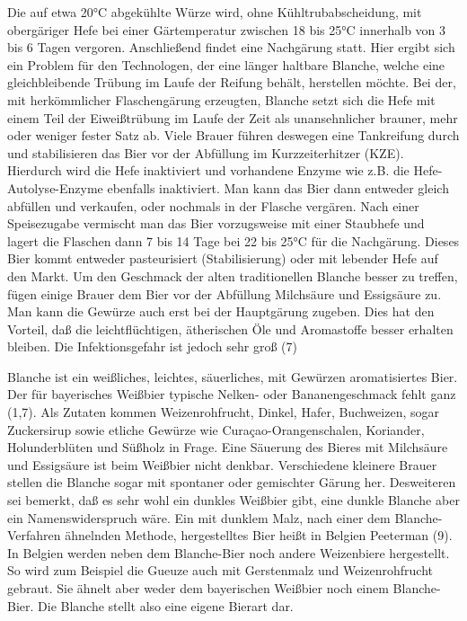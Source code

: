 \documentclass[a4paper,parskip=half]{scrartcl}
\begin{document}
Die auf etwa 20°C abgekühlte Würze wird, ohne Kühltrubabscheidung, mit
obergäriger Hefe bei einer Gärtemperatur zwischen 18 bis 25°C innerhalb von
3 bis 6 Tagen vergoren. Anschließend findet eine Nachgärung statt. Hier ergibt sich
ein Problem für den Technologen, der eine länger haltbare Blanche, welche eine
gleichbleibende Trübung im Laufe der Reifung behält, herstellen möchte. Bei der, mit
herkömmlicher Flaschengärung erzeugten, Blanche setzt sich die Hefe mit einem
Teil der Eiweißtrübung im Laufe der Zeit als unansehnlicher brauner, mehr oder
weniger fester Satz ab.
Viele Brauer führen deswegen eine Tankreifung durch und stabilisieren das Bier vor
der Abfüllung im Kurzzeiterhitzer (KZE). Hierdurch wird die Hefe inaktiviert und
vorhandene Enzyme wie z.B. die Hefe-Autolyse-Enzyme ebenfalls inaktiviert. Man
kann das Bier dann entweder gleich abfüllen und verkaufen, oder nochmals in der
Flasche vergären. Nach einer Speisezugabe vermischt man das Bier vorzugsweise
mit einer Staubhefe und lagert die Flaschen dann 7 bis 14 Tage bei 22 bis 25°C für
die Nachgärung.
Dieses Bier kommt entweder pasteurisiert (Stabilisierung) oder mit lebender Hefe auf
den Markt.
Um den Geschmack der alten traditionellen Blanche besser zu treffen, fügen einige
Brauer dem Bier vor der Abfüllung Milchsäure und Essigsäure zu.
Man kann die Gewürze auch erst bei der Hauptgärung zugeben. Dies hat den Vorteil,
daß die leichtflüchtigen, ätherischen Öle und Aromastoffe besser erhalten bleiben.
Die Infektionsgefahr ist jedoch sehr groß (7)

\parencite[18\psq]{Strottner1999}
Blanche ist ein weißliches, leichtes, säuerliches, mit Gewürzen aromatisiertes Bier.
Der für bayerisches Weißbier typische Nelken- oder Bananengeschmack fehlt ganz
(1,7). Als Zutaten kommen Weizenrohfrucht, Dinkel, Hafer, Buchweizen, sogar
Zuckersirup sowie etliche Gewürze wie Curaçao-Orangenschalen, Koriander,
Holunderblüten und Süßholz in Frage. Eine Säuerung des Bieres mit Milchsäure und
Essigsäure ist beim Weißbier nicht denkbar. Verschiedene kleinere Brauer stellen die
Blanche sogar mit spontaner oder gemischter Gärung her.
Desweiteren sei bemerkt, daß es sehr wohl ein dunkles Weißbier gibt, eine dunkle
Blanche aber ein Namenswiderspruch wäre. Ein mit dunklem Malz, nach einer dem
Blanche-Verfahren ähnelnden Methode, hergestelltes Bier heißt in Belgien
Peeterman (9).
In Belgien werden neben dem Blanche-Bier noch andere Weizenbiere hergestellt. So
wird zum Beispiel die Gueuze auch mit Gerstenmalz und Weizenrohfrucht gebraut.
Sie ähnelt aber weder dem bayerischen Weißbier noch einem Blanche-Bier.
Die Blanche stellt also eine eigene Bierart dar.
\end{document}
